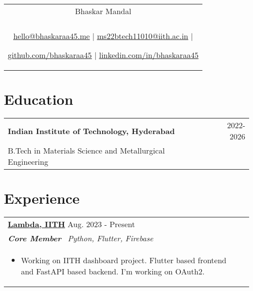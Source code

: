 \documentclass[a4paper,8pt]{article}
\begin{document}
\pagestyle{empty} 


\begin{tabularx}{\linewidth}{@{} C @{}}
\color[HTML]{1C033C} \Huge{Bhaskar Mandal} \\[6pt]
\\
\textcolor[HTML]{371e77}{\underline{\href{mailto:hello@bhaskaraa45.me}{\raisebox{-0.05\height}{\faEnvelope} hello@bhaskaraa45.me}} $|$}
\textcolor[HTML]{371e77}{\underline{\href{mailto:ms22btech11010@iith.ac.in}{\raisebox{-0.05\height}{\faEnvelope} ms22btech11010@iith.ac.in}} $|$}

\textcolor[HTML]{371e77}{\underline{\href{https://github.com/bhaskaraa45}{\raisebox{-0.05\height}{\faGithub} github.com/bhaskaraa45}} $|$}
\textcolor[HTML]{371e77}{\underline{\href{https://linkedin.com/in/bhaskaraa45}{\raisebox{-0.05\height}{\faLinkedin} linkedin.com/in/bhaskaraa45}}}
\end{tabularx}

\section{Education}
\begin{tabularx}{\linewidth}{ @{}l r@{} }
\color[HTML]{1C033C} \textbf{Indian Institute of Technology, Hyderabad} & \hfill \color[HTML]{371e77} 2022-2026 \\
\color[HTML]{371e77} B.Tech in Materials Science and Metallurgical Engineering 

\end{tabularx}


\section{Experience}
\begin{tabularx}{\linewidth}{ @{}l r@{} }
\textbf{\uline{Lambda, IITH}} \hfill \color[HTML]{371e77} Aug. 2023 - Present \\[4pt]
\color[HTML]{371e77}\textbf{\textit{Core Member}}\ \hfill \color[HTML]{4B28A4} \textit{Python, Flutter, Firebase} \\[5pt]
\begin{minipage}[t]{\linewidth}
    \begin{itemize}[nosep,after=\strut, leftmargin=2em, itemsep=2pt]
        \item Working on IITH dashboard project. Flutter based frontend and FastAPI based backend. I'm working on OAuth2.
    \end{itemize}
\end{minipage}
\end{tabularx}
\end{document}
